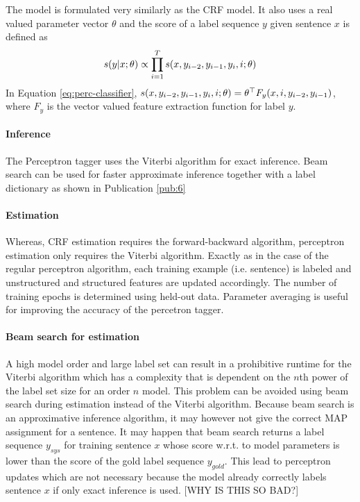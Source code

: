 The model is formulated very similarly as the CRF model. It also uses
a real valued parameter vector $\theta$ and the score of a label
sequence $y$ given sentence $x$ is defined as
\begin{equation}s(y|x\mbox{$ ; \, $}\theta) \propto \prod_{i = 1}^T s(x,
  y_{i-2}, y_{i-1}, y_i, i\mbox{$ ; \, $}
  \theta)\label{eq:perc-classifier}\end{equation} In Equation
\ref{eq:perc-classifier}, $s(x, y_{i-2}, y_{i-1}, y_i, i\mbox{$ ; \, $}
\theta) = \theta^\top F_y(x, i, y_{i-2}, y_{i-1})$, where $F_y$ is the
vector valued feature extraction function for label $y$.

\paragraph{Inference} The Perceptron tagger uses the Viterbi algorithm
for exact inference. Beam search can be used for faster approximate
inference together with a label dictionary as shown in Publication \ref{pub:6}

\paragraph{Estimation}Whereas, CRF estimation requires the
forward-backward algorithm, perceptron estimation only requires the
Viterbi algorithm.  Exactly as in the case of the regular perceptron
algorithm, each training example (i.e. sentence) is labeled and
unstructured and structured features are updated accordingly. The
number of training epochs is determined using held-out data. Parameter
averaging is useful for improving the accuracy of the percetron
tagger.

\paragraph{Beam search for estimation} A high model order and large
label set can result in a prohibitive runtime for the Viterbi
algorithm which has a complexity that is dependent on the $n$th power
of the label set size for an order $n$ model. This problem can be
avoided using beam search during estimation instead of the Viterbi
algorithm. Because beam search is an approximative inference
algorithm, it may however not give the correct MAP assignment for a
sentence. It may happen that beam search returns a label sequence
$y_{sys}$ for training sentence $x$ whose score w.r.t. to model
parameters is lower than the score of the gold label sequence
$y_{gold}$. This lead to perceptron updates which are not necessary
because the model already correctly labels sentence $x$ if only exact
inference is used. [WHY IS THIS SO BAD?]

